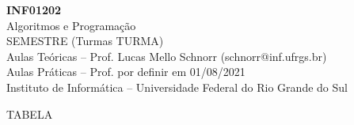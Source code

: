 \documentclass[11pt,portuguese,]{article}
\begin{document}
\clearpage\thispagestyle{empty}

\begin{center}
  {\LARGE     {\bf INF01202} \\
    Algoritmos e Programação \\
    SEMESTRE (Turmas TURMA)} \\
  Aulas Teóricas -- Prof. Lucas Mello Schnorr (schnorr@inf.ufrgs.br) \\
  Aulas Práticas -- Prof. por definir em 01/08/2021 \\
  Instituto de Informática -- Universidade Federal do Rio Grande do Sul
\end{center}

TABELA
\end{document}
